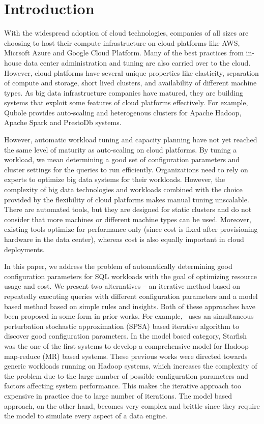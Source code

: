 \section{Introduction}

With the widespread adoption of cloud technologies, companies of all sizes are choosing to host their compute infrastructure on cloud platforms like AWS, Micrsoft Azure and Google Cloud Platform. 
Many of the best practices from in-house data center administration and tuning are also carried over to the cloud. However, cloud platforms have several unique properties like elasticity, separation of compute and storage, short lived clusters, and availability of different machine types. As big data infrastructure companies have matured, they are building systems that exploit some features of cloud platforms effectively. For example, Qubole provides auto-scaling 
and heterogenous clusters for Apache Hadoop, Apache Spark and PrestoDb systems. 

However, automatic workload tuning and capacity planning have not yet reached the same level of maturity as auto-scaling on cloud platforms. By tuning a workload, we mean determining a good set of configuration parameters and cluster settings for the queries to run efficiently. Organizations need to rely on experts to optimize big data systems for their workloads. However, the 
complexity of big data technologies and workloads combined with the choice provided by the flexibility of cloud platforms makes manual tuning unscalable. There are automated tools, but they are designed for static clusters and do not consider that more machines or different machine types can be used. 
Moreover, existing tools optimize
for performance only (since cost is fixed after provisioning hardware in the data center), whereas cost is also equally important in cloud deployments. 

In this paper, we address the problem of automatically determining good configuration parameters for SQL workloads with the goal of optimizing resource usage and cost. We present two alternatives -- an iterative method based on repeatedly executing queries with different configuration parameters and a model based method based on simple rules and insights. Both of these approaches have been proposed in some form in prior works. For example,~\cite{KumarPLPGB16} uses an simultaneous perturbation stochastic approximation (SPSA) based iterative algorithm to discover good configuration parameters. In the model based category, Starfish~\cite{herodotou2011profiling, herodotou2011starfish} was the one of the first systems to develop a comprehensive model for Hadoop map-reduce (MR) based systems. These previous works were directed towards generic workloads running on Hadoop systems, which increases the complexity of the problem due to the large number of possible configuration parameters and factors affecting system performance. This makes the iterative approach too expensive in practice due to large number of iterations. The model based approach, on the other hand, becomes very complex and brittle since they require the model to simulate every aspect of a data engine.

